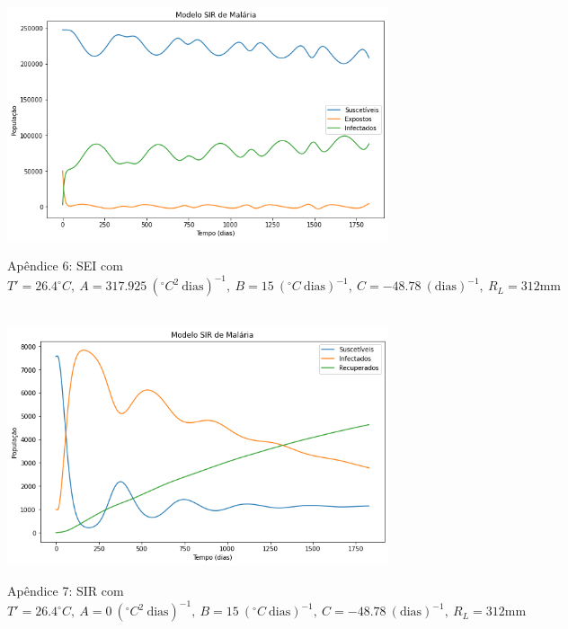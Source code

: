\documentclass[12pt]{article}
\begin{document}
\begin{figure}[!ht]
        \centering
        \hbox{\hspace{2.0em} \includegraphics[scale=0.55] {SEI_Correcao_b3.png}}
        \caption*{Apêndice 6: SEI com $T'=26.4^\circ C, \ A=317.925 \ (^\circ C^2 \ \text{dias})^{-1}, \ B=15 \ (^\circ C \ \text{dias})^{-1}, \ C=-48.78 \ (\text{dias})^{-1}, \ R_L=312 \text{mm}$}
\end{figure}
\newpage
\begin{figure}[!ht]
        \centering
        \hbox{\hspace{2.5em} \includegraphics[scale=0.55] {SIR_Correcao_b3_A0.png}}
        \caption*{Apêndice 7: SIR com $T'=26.4^\circ C, \ A=0 \ (^\circ C^2 \ \text{dias})^{-1}, \ B=15 \ (^\circ C \ \text{dias})^{-1}, \ C=-48.78 \ (\text{dias})^{-1}, \ R_L=312 \text{mm}$}
\end{figure} 
\end{document}

